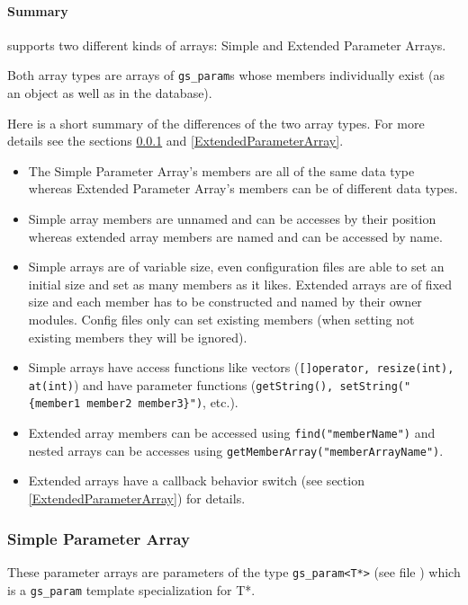 \paragraph{Summary}

\GreenConfig supports two different kinds of arrays: Simple and Extended Parameter Arrays.

Both array types are arrays of \lstinline|gs_param|s whose members individually exist (as an object as well as in the database).

Here is a short summary of the differences of the two array types. For more details see the sections \ref{SimpleParameterArray} and \ref{ExtendedParameterArray}.

\begin{itemize}
    \item The Simple Parameter Array's members are all of the same data type whereas Extended Parameter Array's members can be of different data types.
    \item Simple array members are unnamed and can be accesses by their position whereas extended array members are named and can be accessed by name.
    \item Simple arrays are of variable size, even configuration files are able to set an initial size and set as many members as it likes. Extended arrays are of fixed size and each member has to be constructed and named by their owner modules. Config files only can set existing members (when setting not existing members they will be ignored).
    \item Simple arrays have access functions like vectors (\lstinline|[]operator, resize(int), at(int)|) and have parameter functions (\lstinline|getString(), setString("{member1 member2 member3}")|, etc.).
    \item Extended array members can be accessed using \lstinline|find("memberName")| and nested arrays can be accesses using \lstinline|getMemberArray("memberArrayName")|.
    \item Extended arrays have a callback behavior switch (see section \ref{ExtendedParameterArray}) for details.
\end{itemize}

\subsubsection{Simple Parameter Array}
\label{SimpleParameterArray}

These parameter arrays are parameters of the type \lstinline|gs_param<T*>| (see file ) which is a \lstinline|gs_param| template specialization for T*.

